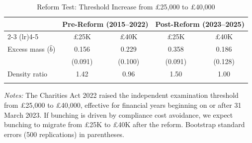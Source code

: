 \begin{table}[htbp]
\centering
\caption{Reform Test: Threshold Increase from \pounds25,000 to \pounds40,000}
\label{tab:reform}
\begin{tabular}{lcccc}
\hline\hline
& \multicolumn{2}{c}{Pre-Reform (2015--2022)} & \multicolumn{2}{c}{Post-Reform (2023--2025)} \\
\cmidrule(lr){2-3} \cmidrule(lr){4-5}
& \pounds25K & \pounds40K & \pounds25K & \pounds40K \\
\hline
\addlinespace
Excess mass ($\hat{b}$) & 0.156 & 0.229 & 0.358 & 0.186 \\
& (0.091) & (0.100) & (0.091) & (0.128) \\
Density ratio & 1.42 & 0.96 & 1.50 & 1.00 \\
\addlinespace
\hline\hline
\end{tabular}
\begin{tablenotes}[flushleft]
\small
\item \textit{Notes:} The Charities Act 2022 raised the independent examination threshold from \pounds25,000 to \pounds40,000, effective for financial years beginning on or after 31 March 2023. If bunching is driven by compliance cost avoidance, we expect bunching to migrate from \pounds25K to \pounds40K after the reform. Bootstrap standard errors (500 replications) in parentheses.
\end{tablenotes}
\end{table}
